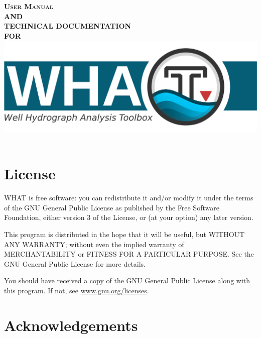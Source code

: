 \documentclass[12pt, letterpaper, fleqn]{report}
\begin{document}
\begin{titlepage}
\begin{center}

\textbf{\textsc{\fontsize{30}{36}\selectfont User Manual}}\\[1.0cm]
\textbf{\textsc{\fontsize{30}{36}\selectfont AND}}\\[1.0cm]
\textbf{\textsc{\fontsize{30}{36}\selectfont TECHNICAL DOCUMENTATION}}\\[1.0cm]
\textbf{\textsc{\fontsize{30}{36}\selectfont FOR}}\\

\includegraphics[width=1\textwidth]{WHAT_banner}~\\[1cm]

\end{center}
\end{titlepage}


\chapter*{License}

WHAT is free software: you can redistribute it and/or modify it under the terms of the GNU General Public License as published by the Free Software Foundation, either version 3 of the License, or (at your option) any later version.

This program is distributed in the hope that it will be useful, but WITHOUT ANY WARRANTY; without even the implied warranty of MERCHANTABILITY or FITNESS FOR A PARTICULAR PURPOSE. See the GNU General Public License for more details.

You should have received a copy of the GNU General Public License along with this program. If not, see \url{www.gnu.org/licenses}.

\newpage

\chapter*{Acknowledgements}
\end{document}
